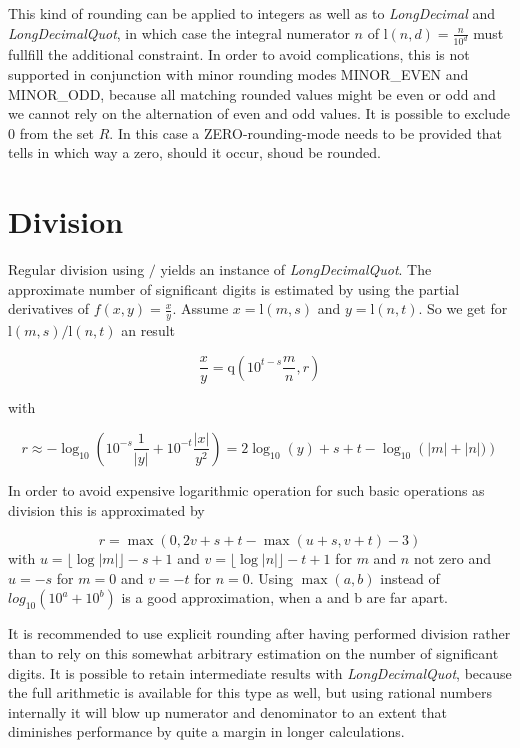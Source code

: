 \documentclass[10pt,a4paper]{article}
\def\ld{\mathrm l}
\def\ldq{\mathrm q}
\begin{document}
This kind of rounding can be applied to integers as well as to
{\slshape LongDecimal\/} and {\slshape LongDecimalQuot\/}, in which case the integral numerator
$n$ of $\ld(n, d)=\frac{n}{10^d}$ must fullfill the additional
constraint.  In order to avoid complications, this is not supported in
conjunction with minor rounding modes MINOR\_EVEN and MINOR\_ODD,
because all matching rounded values might be even or odd and we cannot
rely on the alternation of even and odd values.
It is possible to exclude $0$ from the set $R$. In this case a
ZERO-rounding-mode needs to be provided that tells in which way a
zero, should it occur, shoud be rounded.

\pagebreak

\section{Division}

Regular division using $/$ yields an instance of {\slshape LongDecimalQuot\/}.  The approximate number of significant digits is estimated by using the partial derivatives of $f(x, y) = \frac{x}{y}$.
Assume $x=\ld(m, s)$ and $y=\ld(n, t)$.  So we get for $\ld(m, s) / \ld(n, t)$ an result

$$\frac{x}{y} = \ldq(10^{t-s}\frac{m}{n}, r)$$

with

$$r \approx -\log_{10}\left(10^{-s} \frac{1}{|y|} + 10^{-t} \frac{|x|}{y^2}\right)
    =  2 \log_{10}(y) + s + t -\log_{10}\left(|m| + |n|) \right)$$

In order to avoid expensive logarithmic operation for such basic operations as division this is approximated by

$$r = \max( 0, 2 v + s + t - \max( u + s, v + t) - 3)$$
with $u = \lfloor\log |m| \rfloor - s + 1$ and $v = \lfloor\log |n| \rfloor - t + 1$ for $m$ and $n$ not zero
and $u=-s$ for $m = 0$ and $v=-t$ for $n=0$.  Using $\max(a, b)$ instead of $log_{10}(10^a + 10^b)$ is a good approximation, when a and b are far apart.

It is recommended to use explicit rounding after having performed
division rather than to rely on this somewhat arbitrary estimation on
the number of significant digits.  It is possible to retain
intermediate results with {\slshape LongDecimalQuot\/}, because the
full arithmetic is available for this type as well, but using rational
numbers internally it will blow up numerator and denominator to an
extent that diminishes performance by quite a margin in longer
calculations.
\end{document}
